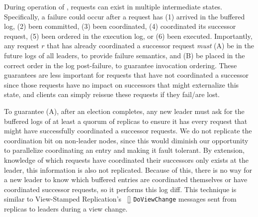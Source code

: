 During operation of \protocol, requests can exist in multiple intermediate states. Specifically, a failure could occur after a request has (1) arrived in the buffered log, (2) been committed, (3) been coordinated, (4) coordinated its successor request, (5) been ordered in the execution log, or (6) been executed. Importantly, any request $r$ that has already coordinated a successor request \textit{must} (A) be in the future logs of all leaders, to provide failure semantics, and (B) be placed in the correct order in the log post-failure, to guarantee invocation ordering. These guarantees are less important for requests that have not coordinated a successor since those requests have no impact on successors that might externalize this state, and clients can simply reissue these requests if they fail/are lost. 

To guarantee (A), after an election completes, any new leader must ask for the buffered logs of at least a quorum of replicas to ensure it has every request that might have successfully coordinated a successor requests. We do not replicate the coordination bit on non-leader nodes, since this would diminish our opportunity to parallelize coordinating an entry and making it fault tolerant. By extension, knowledge of which requests have coordinated their successors only exists at the leader, this information is also not replicated. Because of this, there is no way for a new leader to know which buffered entries are coordinated themselves or have coordinated successor requests, so it performs this log diff. This technique is similar to View-Stamped Replication's ~\ref{} \texttt{DoViewChange} messages sent from replicas to leaders during a view change. 


